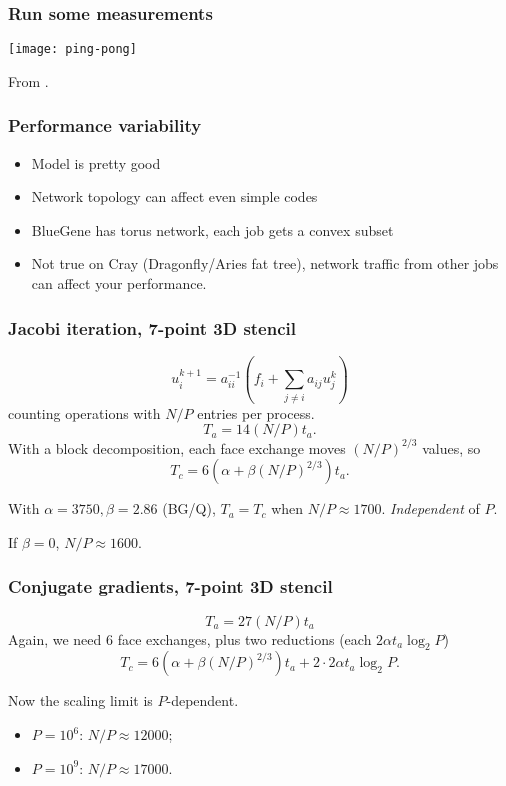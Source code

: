 \documentclass[presentation]{beamer}
\begin{document}
\begin{frame}
  \frametitle{Run some measurements}
  \begin{center}
    \texttt{[image: ping-pong]}
  \end{center}
  From \textcite{Fischer:2015}.
\end{frame}

\begin{frame}
  \frametitle{Performance variability}
  \begin{itemize}
  \item Model is pretty good
  \item Network topology can affect even simple codes
  \item BlueGene has torus network, each job gets a convex subset
  \item Not true on Cray (Dragonfly/Aries fat tree), network traffic
    from other jobs can affect your performance.
  \end{itemize}
\end{frame}

\begin{frame}
  \frametitle{Jacobi iteration, 7-point 3D stencil}
  \begin{equation*}
    u_i^{k+1} = a_{ii}^{-1}\left(f_i + \sum_{j \ne i} a_{ij}u_j^{k}\right)
  \end{equation*}
  counting operations with $N/P$ entries per process.
  \begin{equation*}
    T_a = 14(N/P)t_a.
  \end{equation*}
  With a block decomposition, each face exchange moves $(N/P)^{2/3}$
  values, so
  \begin{equation*}
    T_c = 6 \left(\alpha + \beta (N/P)^{2/3}\right)t_a.
  \end{equation*}

  With $\alpha = 3750, \beta = 2.86$ (BG/Q), $T_a = T_c$ when $N/P
  \approx 1700$.  \emph{Independent} of $P$.

  If $\beta = 0$, $N/P \approx 1600$.
\end{frame}


\begin{frame}
  \frametitle{Conjugate gradients, 7-point 3D stencil}
  \begin{equation*}
    T_a = 27(N/P) t_a
  \end{equation*}
  Again, we need 6 face exchanges, plus two reductions (each $2\alpha t_a \log_2 P$)
  \begin{equation*}
    T_c = 6 \left(\alpha + \beta (N/P)^{2/3}\right)t_a + 2 \cdot 2
    \alpha t_a \log_2 P.
  \end{equation*}

  Now the scaling limit is $P$-dependent.

  \begin{itemize}
    \item $P=10^6$: $N/P \approx 12000$;
    \item $P=10^9$: $N/P \approx 17000$.
  \end{itemize}
\end{frame}
\end{document}
